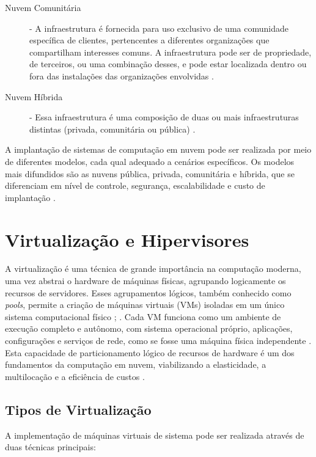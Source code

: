 \begin{description}
    \item[Nuvem Comunitária] - A infraestrutura é fornecida para uso exclusivo de uma comunidade específica de clientes, pertencentes a diferentes organizações que compartilham interesses comuns. A infraestrutura pode ser de propriedade, de terceiros, ou uma combinação desses, e pode estar localizada dentro ou fora das instalações das organizações envolvidas \cite{mell2011}.
    \item[Nuvem Híbrida] - Essa infraestrutura é uma composição de duas ou mais infraestruturas distintas (privada, comunitária ou pública)  \cite{mell2011}.
\end{description}

A implantação de sistemas de computação em nuvem pode ser realizada por meio de diferentes modelos, cada qual adequado a cenários específicos. Os modelos mais difundidos são as nuvens pública, privada, comunitária e híbrida, que se diferenciam em nível de controle, segurança, escalabilidade e custo de implantação \cite{mell2011}.

\section{Virtualização e Hipervisores}
A virtualização é uma técnica de grande importância na computação moderna, uma vez  abstrai o hardware de máquinas físicas, agrupando logicamente os recursos de servidores. Esses agrupamentos lógicos, também conhecido como \textit{pools}, permite a criação de máquinas virtuais (VMs) isoladas em um único sistema computacional físico \cite{carissimi2008}; \cite{kominos2017}. Cada VM funciona como um ambiente de execução completo e autônomo, com sistema operacional próprio, aplicações, configurações e  serviços de rede, como se fosse uma máquina física independente \cite{carissimi2008}. Esta capacidade de particionamento lógico de recursos de hardware é um dos fundamentos da computação em nuvem, viabilizando a elasticidade, a multilocação e a eficiência de custos \cite{chawla2025}.

\subsection{Tipos de Virtualização}
A implementação de máquinas virtuais de sistema pode ser realizada através de duas técnicas principais:

